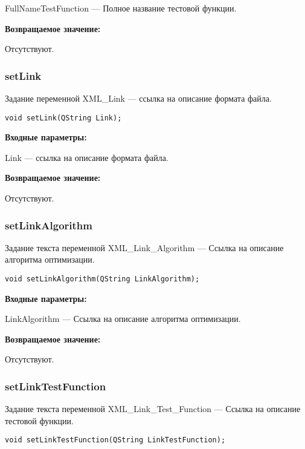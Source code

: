 \documentclass[a4paper,12pt]{article}
\begin{document}
FullNameTestFunction --- Полное название тестовой функции.

\textbf{Возвращаемое значение:}

Отсутствуют.


\subsubsection{setLink}\label{setLink}

Задание переменной XML\_Link --- ссылка на описание формата файла.


\begin{lstlisting}[label=code_syntax_setLink,caption=Синтаксис]
void setLink(QString Link);
\end{lstlisting}

\textbf{Входные параметры:}

Link --- ссылка на описание формата файла.

\textbf{Возвращаемое значение:}

Отсутствуют.


\subsubsection{setLinkAlgorithm}\label{setLinkAlgorithm}

Задание текста переменной  XML\_Link\_Algorithm --- Ссылка на описание алгоритма оптимизации.


\begin{lstlisting}[label=code_syntax_setLinkAlgorithm,caption=Синтаксис]
void setLinkAlgorithm(QString LinkAlgorithm);
\end{lstlisting}

\textbf{Входные параметры:}

LinkAlgorithm --- Ссылка на описание алгоритма оптимизации.

\textbf{Возвращаемое значение:}

Отсутствуют.


\subsubsection{setLinkTestFunction}\label{setLinkTestFunction}

Задание текста переменной  XML\_Link\_Test\_Function --- Ссылка на описание тестовой функции.


\begin{lstlisting}[label=code_syntax_setLinkTestFunction,caption=Синтаксис]
void setLinkTestFunction(QString LinkTestFunction);
\end{lstlisting}
\end{document}
